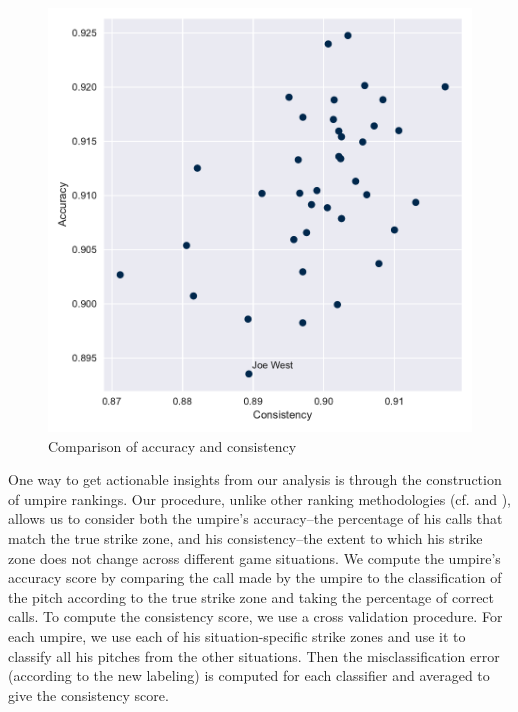 \documentclass[letterpaper,12pt]{article}
\begin{document}
\begin{figure} 
\centering
\vspace{-0.75cm}
  \includegraphics[scale=0.45]{graphics/Ranking.pdf}
  \vspace{-0.88cm}
  \caption{Comparison of accuracy and consistency}
  \label{fig:rankings}
\end{figure}

One way to get actionable insights from our analysis is through the construction of umpire rankings. 
Our procedure, unlike other ranking methodologies (cf. \cite{ump-audit} and \cite{bu-umps}), allows us to consider both the umpire's accuracy--the percentage of his calls that match the true strike zone, and his consistency--the extent to which his strike zone does not change across different game situations. 
We compute the umpire's accuracy score by comparing the call made by the umpire to the classification of the pitch according to the true strike zone and taking the percentage of correct calls. 
To compute the consistency score, we use a cross validation procedure. %
For each umpire, we use each of his situation-specific strike zones and use it to classify all his pitches from the other situations. 
Then the misclassification error (according to the new labeling) is computed for each classifier and averaged to give the consistency score.
\end{document}
